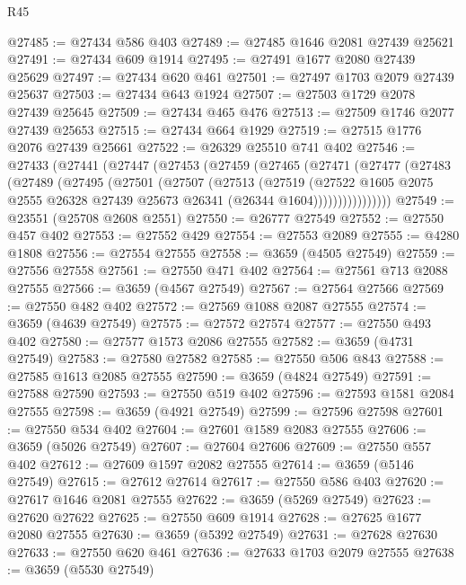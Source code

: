 \begin{lexlean}{R45}
\begin{coremodule}
@27485 := @27434 @586 @403
@27489 := @27485 @1646 @2081 @27439 @25621
@27491 := @27434 @609 @1914
@27495 := @27491 @1677 @2080 @27439 @25629
@27497 := @27434 @620 @461
@27501 := @27497 @1703 @2079 @27439 @25637
@27503 := @27434 @643 @1924
@27507 := @27503 @1729 @2078 @27439 @25645
@27509 := @27434 @465 @476
@27513 := @27509 @1746 @2077 @27439 @25653
@27515 := @27434 @664 @1929
@27519 := @27515 @1776 @2076 @27439 @25661
@27522 := @26329 @25510 @741 @402
@27546 := @27433
    (@27441
      (@27447
        (@27453
          (@27459
            (@27465
              (@27471
                (@27477
                  (@27483
                    (@27489
                      (@27495
                        (@27501
                          (@27507
                            (@27513
                              (@27519
                                (@27522
                                  @1605
                                  @2075
                                  @2555
                                  @26328
                                  @27439
                                  @25673
                                  @26341
                                  (@26344 @1604))))))))))))))))
@27549 := @23551 (@25708 @2608 @2551)
@27550 := @26777 @27549
@27552 := @27550 @457 @402
@27553 := @27552 @429
@27554 := @27553 @2089
@27555 := @4280 @1808
@27556 := @27554 @27555
@27558 := @3659 (@4505 @27549)
@27559 := @27556 @27558
@27561 := @27550 @471 @402
@27564 := @27561 @713 @2088 @27555
@27566 := @3659 (@4567 @27549)
@27567 := @27564 @27566
@27569 := @27550 @482 @402
@27572 := @27569 @1088 @2087 @27555
@27574 := @3659 (@4639 @27549)
@27575 := @27572 @27574
@27577 := @27550 @493 @402
@27580 := @27577 @1573 @2086 @27555
@27582 := @3659 (@4731 @27549)
@27583 := @27580 @27582
@27585 := @27550 @506 @843
@27588 := @27585 @1613 @2085 @27555
@27590 := @3659 (@4824 @27549)
@27591 := @27588 @27590
@27593 := @27550 @519 @402
@27596 := @27593 @1581 @2084 @27555
@27598 := @3659 (@4921 @27549)
@27599 := @27596 @27598
@27601 := @27550 @534 @402
@27604 := @27601 @1589 @2083 @27555
@27606 := @3659 (@5026 @27549)
@27607 := @27604 @27606
@27609 := @27550 @557 @402
@27612 := @27609 @1597 @2082 @27555
@27614 := @3659 (@5146 @27549)
@27615 := @27612 @27614
@27617 := @27550 @586 @403
@27620 := @27617 @1646 @2081 @27555
@27622 := @3659 (@5269 @27549)
@27623 := @27620 @27622
@27625 := @27550 @609 @1914
@27628 := @27625 @1677 @2080 @27555
@27630 := @3659 (@5392 @27549)
@27631 := @27628 @27630
@27633 := @27550 @620 @461
@27636 := @27633 @1703 @2079 @27555
@27638 := @3659 (@5530 @27549)

\end{coremodule}
\end{lexlean}
